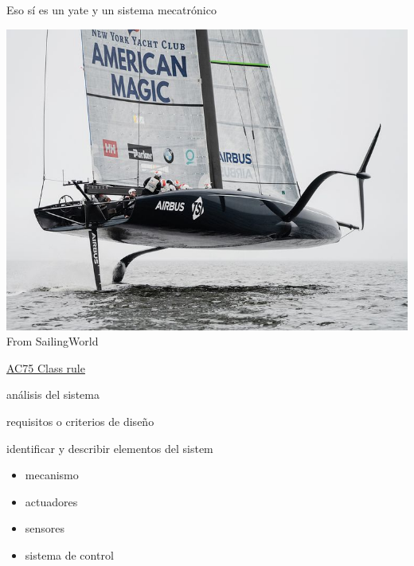 \documentclass[presentation,aspectratio=169]{beamer}
\begin{document}
\begin{frame}[label={sec:orge9e3f26}]{Eso \alert{sí} es un yate \alert{y} un sistema mecatrónico}
\begin{center}
\includegraphics[height=0.7\textheight]{../../figures/ac75.jpeg}\\
{\footnotesize  From SailingWorld}
\end{center}

\href{https://www.sailingscuttlebutt.com/wp-content/uploads/2018/03/AC75\_Class\_Rule.pdf}{AC75 Class rule}
\end{frame}

\begin{frame}[label={sec:org7b5eac4}]{análisis del sistema}
\begin{block}{requisitos o criterios de diseño}
\end{block}

\begin{block}{identificar y describir elementos del sistem}
\begin{itemize}
\item mecanismo
\item actuadores
\item sensores
\item sistema de control
\end{itemize}
\end{block}
\end{frame}
\end{document}
